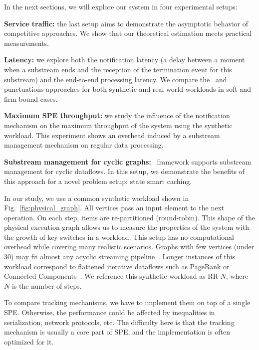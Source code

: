 In the next sections, we will explore our system in four experimental setups:
    
    \noindent \textbf{Service traffic:} the last setup aims to demonstrate the asymptotic behavior of competitive approaches. We show that our theoretical estimation meets practical measurements.
    
    \noindent \textbf{Latency:} we explore both the notification latency (a delay between a moment when a substream ends and the reception of the termination event for this substream) and the end-to-end processing latency. We compare the \tracker\ and punctuations approaches for both synthetic and real-world workloads in soft and firm bound cases.
    
    \noindent \textbf{Maximum SPE throughput:} we study the influence of the notification mechanism on the maximum throughput of the system using the synthetic workload. This experiment shows an overhead induced by a substream management mechanism on regular data processing.
    
    \noindent \textbf{Substream management for cyclic graphs:} \tracker\ framework supports substream management for cyclic dataflows. In this setup, we demonstrate the benefits of this approach for a novel problem setup: state smart caching.


In our study, we use a common synthetic workload shown in Fig.~\ref{fig:physical_graph}. All vertices pass an input element to the next operation. On each step, items are re-partitioned (round-robin). This shape of the physical execution graph allows us to measure the properties of the system with the growth of key switches in a workload. This setup has no computational overhead while covering many realistic scenarios. Graphs with few vertices (under 30) may fit almost any acyclic streaming pipeline~\cite{akidau2018streaming}. Longer instances of this workload correspond to flattened iterative dataflows such as PageRank or Connected Components~\cite{Murray:2013:NTD:2517349.2522738, xu2016efficient}. We reference this synthetic workload as RR-$N$, where $N$ is the number of steps.

To compare tracking mechanisms, we have to implement them on top of a single SPE. Otherwise, the performance could be affected by inequalities in serialization, network protocols, etc.  The difficulty here is that the tracking mechanism is usually a core part of SPE, and the implementation is often optimized for it. 

